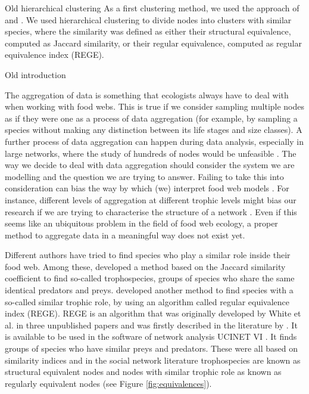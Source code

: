 Old hierarchical clustering
    As a first clustering method, we used the approach of \citet{Yodzis1999} and \citet{Luczkovich2003}. We used hierarchical clustering to divide nodes into clusters with similar species, where the similarity was defined as either their structural equivalence, computed as Jaccard similarity, or their regular equivalence, computed as regular equivalence index (REGE).


Old introduction
    \par The aggregation of data is something that ecologists always have to deal with when working with food webs. This is true if we consider sampling multiple nodes as if they were one as a process of data aggregation (for example, by sampling a species without making any distinction between its life stages and size classes). A further process of data aggregation can happen during data analysis, especially in large networks, where the study of hundreds of nodes would be unfeasible \citep{Yodzis1999}. The way we decide to deal with data aggregation should consider the system we are modelling and the question we are trying to answer. Failing to take this into consideration can bias the way by which (we) interpret food web models \citep{Paine1988,Hall1993}. For instance, different levels of aggregation at different trophic levels might bias our research if we are trying to characterise the structure of a network \citep{Yodzis1999}. Even if this seems like an ubiquitous problem in the field of food web ecology, a proper method to aggregate data in a meaningful way does not exist yet.
    \par Different authors have tried to find species who play a similar role inside their food web. Among these, \citet{Yodzis1999} developed a method based on the Jaccard similarity coefficient to find so-called trophospecies, groups of species who share the same identical predators and preys. \citet{Luczkovich2003} developed another method to find species with a so-called similar trophic role, by using an algorithm called regular equivalence index (REGE). REGE is an algorithm that was originally developed by White et al. in three unpublished papers and was firstly described in the literature by \citet{Borgatti1993}. It is available to be used in the software of network analysis UCINET VI \citep{Borgatti2002}. It finds groups of species who have similar preys and predators. These were all based on similarity indices and in the social network literature trophospecies are known as structural equivalent nodes and nodes with similar trophic role as known as regularly equivalent nodes (see Figure \ref{fig:equivalences}). 
